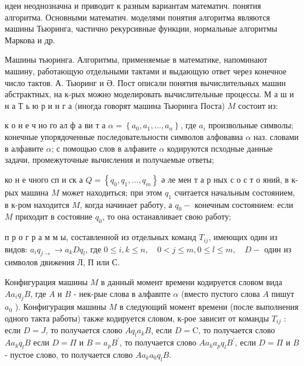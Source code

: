 \documentclass[10pt]{article}
\begin{document}
идеи неоднозначна и приводит к разным вариантам математич. понятия алгоритма. Основными математич. моделями понятия алгоритма являются машины Тьюринга, частично рекурсивные функции, нормальные алгоритмы Маркова и др.



Машины тьюринга. Алгоритмы, применяемые в математике, напоминают машину, работающую отдельными тактами и выдающую ответ через конечное число тактов. А. Тьюринг и Ә. Пост описали понятия вычислительных машин абстрактных, на к-рых можно моделировать вычислительные процессы. М а ш и н а Т ь ю р и н г а (иногда говорят машина Тьюринга Поста) $M$ состоит из:



к о н е ч но го ал ф а ви т а $\alpha=\left\{a_{0}, a_{1}, \ldots, a_{n}\right\}$, где $a_{i}$ произвольные символы; конечные упорядоченные последовательности символов алфовавиа $\alpha$ наз. словами в алфавите $\alpha$; с помощью слов в алфавите $\alpha$ кодируются псходные данные задачи, промежуточные вычисления и получаемые ответы;



ко н е чного сп и ск а $Q=\left\{q_{0}, q_{1}, \ldots, q_{m}\right\}$ ә ле мен т а р ных с о с т о яний, в к-рых машина $M$ может находиться; при этом $q_{1}$ считается начальным состоянием, в к-ром находится $M$, когда начинает работу, а $q_{0}-$ конечным состоянием: если $M$ приходит в состояние $q_{0}$, то она останавливает свою работу;



п р о г р а м м ы, составленной из отдельных команд $T_{i j}$, имеющих один из видов: $a_{i} q_{j \rightarrow} \rightarrow a_{k} D q_{l}$, где $0 \leqslant i, k \leqslant n, \quad 0<j \leqslant m, 0 \leqslant l \leqslant m, \quad D-$ один из символов движения Л, П или С.



Конфигурация машины $M$ в данный момент времени кодируется словом вида $A a_{i} q_{j} B$, где $A$ и $B$ - нек-рые слова в алфавпте $\alpha$ (вместо пустого слова $A$ пишут $a_{0}$ ). Конфигурация машины $M$ в следующий момент времени (после выполнения одного такта работы) также кодируется словом, к-рое зависит от команды $T_{i j}$ : если $D=J$, то получается слово $A q_{l} a_{k} B$, если $D=\mathrm{C}$, то получается слово $A a_{k} q_{l} B$ если $D=\Pi$ и $B=a_{p} B^{\prime}$, то получается слово $A a_{k} a_{p} q_{l} B^{\prime}$, если $D=\Pi$ и $B$ - пустое слово, то получается слово $A a_{k} a_{0} q_{l} B$.
\end{document}
